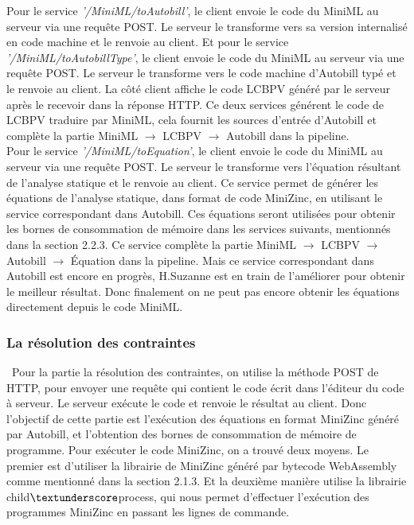\documentclass[12pt]{article}
\begin{document}
Pour le service \emph{'/MiniML/toAutobill'}, le client envoie le code du MiniML au serveur via une requête POST. Le serveur le transforme vers sa version internalisé en code machine et le renvoie au client. Et pour le service \emph{'/MiniML/toAutobillType'}, le client envoie le code du MiniML au serveur via une requête POST. Le serveur le transforme vers le code machine d'Autobill typé et le renvoie au client. La côté client affiche le code LCBPV généré par le serveur après le recevoir dans la réponse HTTP. Ce deux services générent le code de LCBPV traduire par MiniML, cela fournit les sources d'entrée d'Autobill et complète la partie MiniML $\rightarrow$ LCBPV $\rightarrow$ Autobill dans la pipeline.\\

Pour le service \emph{'/MiniML/toEquation'}, le client envoie le code du MiniML au serveur via une requête POST. Le serveur le transforme vers l'équation résultant de l'analyse statique et le renvoie au client. Ce service permet de générer les équations de l'analyse statique, dans format de code MiniZinc, en utilisant le service correspondant dans Autobill. Ces équations seront utilisées pour obtenir les bornes de consommation de mémoire dans les services suivants, mentionnés dans la section 2.2.3. Ce service complète la partie MiniML $\rightarrow$ LCBPV $\rightarrow$ Autobill $\rightarrow$ Équation dans la pipeline. Mais ce service correspondant dans Autobill est encore en progrès, H.Suzanne est en train de l'améliorer pour obtenir le meilleur résultat. Donc finalement on ne peut pas encore obtenir les équations directement depuis le code MiniML.

\subsubsection{La résolution des contraintes}\
 Pour la partie la résolution des contraintes, on utilise la méthode POST de HTTP, pour envoyer une requête qui contient le code écrit dans l'éditeur du code à serveur. Le serveur exécute le code et renvoie le résultat au client. Donc l'objectif de cette partie est l'exécution des équations en format MiniZinc généré par Autobill, et l'obtention des bornes de consommation de mémoire de programme. Pour exécuter le code MiniZinc, on a trouvé deux moyens. Le premier est d'utiliser la librairie de MiniZinc généré par bytecode WebAssembly comme mentionné dans la section 2.1.3. Et la deuxième manière utilise la librairie child$\textunderscore$process, qui nous permet d'effectuer l'exécution des programmes MiniZinc en passant les lignes de commande.\\
 
\end{document}
